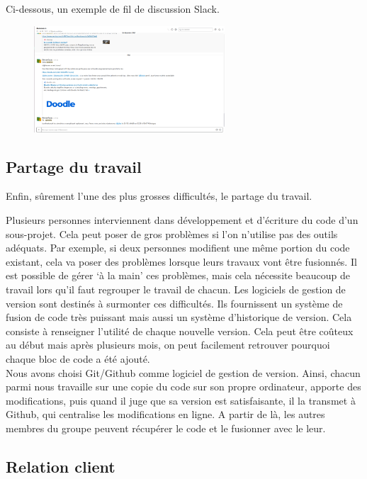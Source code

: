 \documentclass[a4paper]{article}
\begin{document}
\newpage
Ci-dessous, un exemple de fil de discussion Slack.
\begin{figure}[!h]
	\centering
	\includegraphics[keepaspectratio, height=150px]{./tmp/ChatSlack.png}
\end{figure}

\subsection{Partage du travail}

Enfin, sûrement l’une des plus grosses difficultés, le partage du travail.


Plusieurs personnes interviennent dans développement et d’écriture du code d’un sous-projet.
Cela peut poser de gros problèmes si l’on n’utilise pas des outils adéquats. Par exemple, si deux
personnes modifient une même portion du code existant, cela va poser des problèmes lorsque
leurs travaux vont être fusionnés. Il est possible de gérer ‘à la main’ ces problèmes, mais cela
nécessite beaucoup de travail lors qu’il faut regrouper le travail de chacun. Les logiciels de gestion
de version sont destinés à surmonter ces difficultés. Ils fournissent un système de fusion de code
très puissant mais aussi un système d’historique de version. Cela consiste à renseigner l’utilité de
chaque nouvelle version. Cela peut être coûteux au début mais après plusieurs mois, on peut
facilement retrouver pourquoi chaque bloc de code a été ajouté.
\\

Nous avons choisi Git/Github comme logiciel de gestion de version. Ainsi, chacun parmi nous
travaille sur une copie du code sur son propre ordinateur, apporte des modifications, puis quand
il juge que sa version est satisfaisante, il la transmet à Github, qui centralise les modifications en
ligne. A partir de là, les autres membres du groupe peuvent récupérer le code et le fusionner avec
le leur.

\subsection{Relation client}
\end{document}
